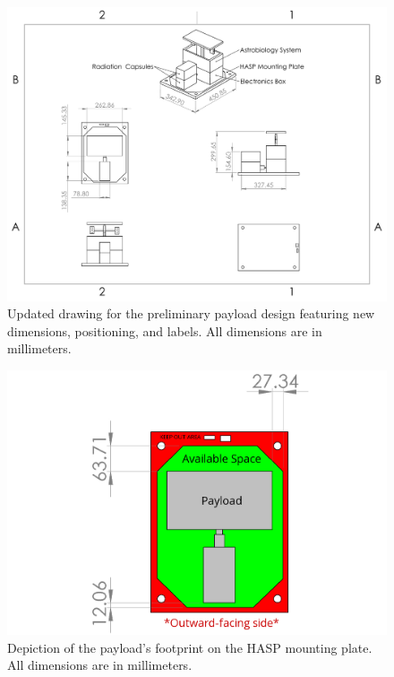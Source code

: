 \begin{figure}[H]
  \centering
  \includegraphics[width=\textwidth]{./Figures/PayloadDrawing-Updated.pdf}
  \caption{Updated drawing for the preliminary payload design featuring new dimensions, positioning, and labels. All dimensions are in millimeters.}
  \label{fig:PayloadDrawing-Updated} 
\end{figure}

\begin{figure}[H]
  \centering
  \includegraphics[width=\textwidth]{./Figures/PayloadFootprint.jpg}
  \caption{Depiction of the payload's footprint on the HASP mounting plate. All dimensions are in millimeters.}
  \label{fig:PayloadFootprint} 
\end{figure}

